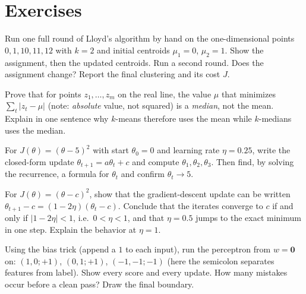\section*{Exercises}
\label{ch36:exercises}

\begin{exercise}
\label{ch36:ex-kmeans-1d}
Run one full round of Lloyd's algorithm by hand on the one-dimensional points
$0, 1, 10, 11, 12$ with $k=2$ and initial centroids $\mu_1 = 0$, $\mu_2 = 1$.
Show the assignment, then the updated centroids. Run a second round. Does the
assignment change? Report the final clustering and its cost $J$.
\end{exercise}

\begin{exercise}
\label{ch36:ex-mean}
Prove that for points $z_1,\dots,z_m$ on the real line, the value $\mu$ that
minimizes $\sum_t |z_t - \mu|$ (note: \emph{absolute} value, not squared) is a
\emph{median}, not the mean. Explain in one sentence why $k$-means therefore uses
the mean while $k$-medians uses the median.
\end{exercise}

\begin{exercise}
\label{ch36:ex-gd-parabola}
For $J(\theta) = (\theta-5)^2$ with start $\theta_0 = 0$ and learning rate
$\eta = 0.25$, write the closed-form update $\theta_{t+1} = a\theta_t + c$ and
compute $\theta_1,\theta_2,\theta_3$. Then find, by solving the recurrence, a
formula for $\theta_t$ and confirm $\theta_t \to 5$.
\end{exercise}

\begin{exercise}
\label{ch36:ex-gd-diverge}
For $J(\theta) = (\theta - c)^2$, show that the gradient-descent update can be
written $\theta_{t+1} - c = (1 - 2\eta)(\theta_t - c)$. Conclude that the
iterates converge to $c$ if and only if $|1 - 2\eta| < 1$, i.e.\ $0 < \eta < 1$,
and that $\eta = 0.5$ jumps to the exact minimum in one step. Explain the
behavior at $\eta = 1$.
\end{exercise}

\begin{exercise}
\label{ch36:ex-perceptron-trace}
Using the bias trick (append a $1$ to each input), run the perceptron from
$w=\mathbf 0$ on: $(1,0;+1)$, $(0,1;+1)$, $(-1,-1;-1)$ (here the semicolon
separates features from label). Show every score and every update. How many
mistakes occur before a clean pass? Draw the final boundary.
\end{exercise}

